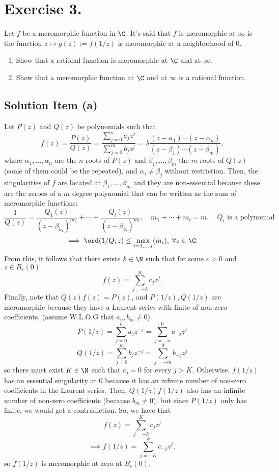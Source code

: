 \section*{Exercise 3.}

Let $f$ be a meromorphic function in $\C$. It's said that $f$ is meromorphic at $\infty$ is the function $z \mapsto g(z) := f(1/z)$ is meromorphic at a neighborhood of $0$.

\begin{enumerate}[label=(\alph*)]
    \item Show that a rational function is meromorphic at $\C$ and at $\infty$.
    \item Show that a meromorphic function at $\C$ and at $\infty$ is a rational function.
\end{enumerate}

\subsection*{Solution Item (a)}

Let $P(z)$ and $Q(z)$ be polynomials such that
\[ f(z) = \frac{P(z)}{Q(z)} = \frac{\sum_{j = 0}^{n} a_j z^j}{\sum_{j = 0}^{m} b_j z^j} = \lambda \frac{(z-\alpha_1)\cdots (z-\alpha_n)}{(z-\beta_1)\cdots (z-\beta_m)}, \]
where $\alpha_1,\ldots, \alpha_n$ are the $n$ roots of $P(z)$ and $\beta_1,\ldots, \beta_m$ the $m$ roots of $Q(z)$ (some of them could be the repeated), and $\alpha_i \neq \beta_j$ without restriction. Then, the singularities of $f$ are located at $\beta_1,\ldots, \beta_m$ and they are non-essential because these are the zeroes of a $m$ degree polynomial that can be written as the sum of meromorphic functions:
\[ \frac{1}{Q(z)} = \frac{Q_1(z)}{(z-\beta_{k_1})^{m_1}} + \cdots + \frac{Q_l(z)}{(z-\beta_{k_l})^{m_l}},\hspace{1em} m_1+\cdots+m_l = m,\hspace{1em} \mbox{$Q_i$ is a polynomial} \]
\[ \implies \ord(1/Q; z) \leq \max_{i = 1,\ldots, l}(m_i),\; \forall z \in \C.\]
From this, it follows that there exists $k \in \N$ such that for some $\varepsilon > 0$ and $z \in B_\varepsilon(0)$
\[ f(z) = \sum_{j = -k}^{\infty} c_j z^j. \]
Finally, note that $Q(z) f(z) = P(z)$, and $P(1/z),Q(1/z)$ are meromorphic because they have a Laurent series with finite of non-zero coefficients, (assume W.L.O.G that $a_n, b_m \neq 0$)
\[ P(1/z) = \sum_{j = 0}^{n} a_j z^{-j} = \sum_{j = -n}^0 a_{-j} z^j \]
\[ Q(1/z) = \sum_{j = 0}^{m} b_j z^{-j} = \sum_{j = -m}^0 b_{-j} z^j \]
so there must exist $K \in \N$ such that $c_j = 0$ for every $j > K$. Otherwise, $f(1/z)$ has an essential singularity at 0 because it has an infinite number of non-zero coefficients in the Laurent series. Then, $Q(1/z) f(1/z)$ also has an infinite number of non-zero coefficients (because $b_{m} \neq 0$), but since $P(1/z)$ only has finite, we would get a contradiction. So, we have that
\[ f(z) = \sum_{j = -k}^{K} c_j z^j \]
\[ \implies f(1/z) = \sum_{j = -K}^{k} c_{-j} z^j, \]
so $f(1/z)$ is meromorphic at zero at $B_\varepsilon(0)$.

